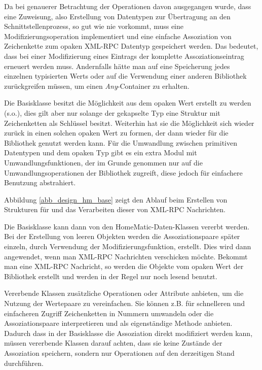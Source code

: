 Da bei genauerer Betrachtung der Operationen davon ausgegangen wurde, dass eine Zuweisung,
also Erstellung von Datentypen zur Übertragung an den Schnittstellenprozess, so gut wie
nie vorkommt, muss eine Modifizierungsoperation implementiert und eine einfache Assoziation
von Zeichenkette zum opaken XML-RPC Datentyp gespeichert werden.
Das bedeutet, dass bei einer Modifizierung eines Eintrags der komplette Assoziationseintrag
erneuert werden muss.
Andernfalls hätte man auf eine Speicherung jedes einzelnen typisierten Werts oder
auf die Verwendung einer anderen Bibliothek zurückgreifen müssen, um einen \emph{Any}-Container
zu erhalten.

Die Basisklasse besitzt die Möglichkeit aus dem opaken Wert erstellt zu werden (s.o.), dies
gilt aber nur solange der gekapselte Typ eine Struktur mit Zeichenketten als Schlüssel
besitzt.
Weiterhin hat sie die Möglichkeit sich wieder zurück in einen solchen opaken Wert
zu formen, der dann wieder für die Bibliothek genutzt werden kann.
Für die Umwandlung zwischen primitiven Datentypen und dem opaken Typ gibt es ein
extra Modul mit Umwandlungsfunktionen, der im Grunde genommen nur auf die Umwandlungsoperationen
der Bibliothek zugreift, diese jedoch für einfachere Benutzung abstrahiert.

\vfill
\pagebreak


Abbildung \ref{abb_design_hm_base} zeigt den Ablauf beim Erstellen von Strukturen für
und das Verarbeiten dieser von XML-RPC Nachrichten.

Die Basisklasse kann dann von den HomeMatic-Daten-Klassen vererbt werden.
Bei der Erstellung von leeren Objekten werden die Assoziationspaare später
einzeln, durch Verwendung der Modifizierungsfunktion, erstellt.
Dies wird dann angewendet, wenn man XML-RPC Nachrichten verschicken möchte.
Bekommt man eine XML-RPC Nachricht, so werden die Objekte vom opaken
Wert der Bibliothek erstellt und werden in der Regel nur noch lesend benutzt.

Vererbende Klassen zusätzliche Operationen oder Attribute anbieten, um die
Nutzung der Wertepaare zu vereinfachen.
Sie können z.B. für schnelleren und einfacheren Zugriff Zeichenketten in Nummern
umwandeln oder die Assoziationspaare interpretieren und als eigenständige Methode
anbieten.
Dadurch dass in der Basisklasse die Assoziation direkt modifiziert werden kann,
müssen vererbende Klassen darauf achten, dass sie keine Zustände der Assoziation
speichern, sondern nur Operationen auf den derzeitigen Stand durchführen.

